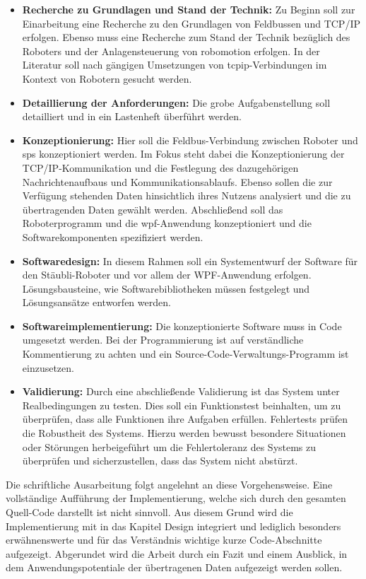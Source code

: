 \documentclass[ a4paper,
                oneside,
                toc=bibliography,
                toc=listof
                ]{scrbook}
\begin{document}
	\begin{itemize}
		\item \textbf{Recherche zu Grundlagen und Stand der Technik:} Zu Beginn soll zur Einarbeitung eine Recherche zu den Grundlagen von Feldbussen und TCP/IP erfolgen. Ebenso muss eine Recherche zum Stand der Technik bezüglich des Roboters und der Anlagensteuerung von \glqq robomotion\grqq{} erfolgen. In der Literatur soll  nach gängigen Umsetzungen von \ac{tcpip}-Verbindungen im Kontext von Robotern gesucht werden.
		\item \textbf{Detaillierung der Anforderungen:} Die grobe Aufgabenstellung soll detailliert und in ein Lastenheft überführt werden.\newpage
		\item \textbf{Konzeptionierung:} Hier soll die Feldbus-Verbindung zwischen Roboter und \ac{sps} konzeptioniert werden. Im Fokus steht dabei die Konzeptionierung der TCP/IP-Kommunikation und die Festlegung des dazugehörigen Nachrichtenaufbaus und Kommunikationsablaufs. Ebenso sollen die zur Verfügung stehenden Daten hinsichtlich ihres Nutzens analysiert und die zu übertragenden Daten gewählt werden. Abschließend soll das Roboterprogramm und die \ac{wpf}-Anwendung konzeptioniert und die Softwarekomponenten spezifiziert werden. 
		\item \textbf{Softwaredesign:} In diesem Rahmen soll ein Systementwurf der Software für den Stäubli-Roboter und vor allem der WPF-Anwendung erfolgen. Lösungsbausteine, wie Softwarebibliotheken müssen festgelegt und Lösungsansätze entworfen werden.
		\item \textbf{Softwareimplementierung:} Die konzeptionierte Software muss in Code umgesetzt werden. Bei der Programmierung ist auf verständliche Kommentierung zu achten und ein Source-Code-Verwaltungs-Programm ist einzusetzen.
		\item \textbf{Validierung:} Durch eine abschließende Validierung ist das System unter Realbedingungen zu testen. Dies soll ein Funktionstest beinhalten, um zu überprüfen, dass alle Funktionen ihre Aufgaben erfüllen. Fehlertests prüfen die Robustheit des Systems. Hierzu werden bewusst besondere Situationen oder Störungen herbeigeführt um die Fehlertoleranz des Systems zu überprüfen und sicherzustellen, dass das System nicht abstürzt. \cite{ISWLeitfaden} \cite{Sommerville}
	\end{itemize}
	Die schriftliche Ausarbeitung folgt angelehnt an diese Vorgehensweise. Eine vollständige Aufführung der Implementierung, welche sich durch den gesamten Quell-Code darstellt ist nicht sinnvoll. Aus diesem Grund wird die Implementierung mit in das Kapitel Design integriert und lediglich besonders erwähnenswerte und für das Verständnis wichtige kurze Code-Abschnitte aufgezeigt. Abgerundet wird die Arbeit durch ein Fazit und einem Ausblick, in dem Anwendungspotentiale der übertragenen Daten aufgezeigt werden sollen.
\end{document}
